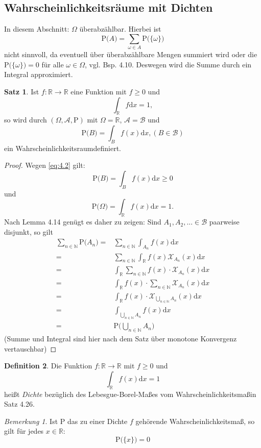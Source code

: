\documentclass[a4paper,12pt,fleqn]{scrartcl}
\newcommand{\N}{\mathbb{N}}
\newcommand{\R}{\mathbb{R}}
\newcommand{\m}[1]{\mathcal{ #1 }}
\newcommand{\prob}[1]{\text{P(} #1 \text{)}}
\newcommand{\WR}{Wahrscheinlichkeitsraum}
\newcommand{\WM}{Wahrscheinlichkeitsmaß}
\theoremstyle{definition}
\newtheorem{definition}{Definition}[section]
\newtheorem{satz}[definition]{Satz}
\theoremstyle{plain}
\theoremstyle{remark}
\newtheorem*{bemerkung}{Bemerkung}
\begin{document}
\subsection{Wahrscheinlichkeitsräume mit Dichten}
In diesem Abschnitt: $\Omega$ überabzählbar.
Hierbei ist
\[\prob{A}=\sum_{\omega\in A}\prob{\{\omega\}}\]
nicht sinnvoll, da eventuell über überabzählbare Mengen summiert wird oder die $\prob{\{\omega\}}=0$ für alle $\omega\in\Omega$, vgl. Bsp. 4.10. Deswegen wird die Summe durch ein Integral approximiert.
\begin{satz}
Ist $f:\R\to\R$ eine Funktion mit $f\geq 0$ und 
\begin{equation*}\label{eq:4.2}
\int_{\R}f\mathrm{d}x=1,
\end{equation*}
so wird durch $(\Omega,\m{A},\text{P})$ mit $\Omega=\R$, $\m{A}=\m{B}$ und
\begin{equation*}\label{eq:4.3}
\prob{B}=\int_{B}f(x)\mathrm{d}x,(B\in\m{B})
\end{equation*}
ein \WR definiert.
\end{satz}
\begin{proof}
Wegen \eqref{eq:4.2} gilt:
\[\prob{B}=\int_Bf(x)\mathrm{d}x\geq 0\]
und
\[\prob{\Omega}=\int_{\R}f(x)\mathrm{d}x=1.\]
Nach Lemma 4.14 genügt es daher zu zeigen: Sind $A_1,A_2,...\in \m{B}$ paarweise disjunkt, so gilt
\begin{align*}
\sum_{n\in\N}\prob{A_n}=&\sum_{n\in\N}\int_{A_n}f(x)\mathrm{d}x\\
=&\sum_{n\in\N}\int_{\R}f(x)\m{X}_{A_n}(x)\mathrm{d}x\\
=&\int_{\R}\sum_{n\in\N}f(x)\cdot\m{X}_{A_n}(x)\mathrm{d}x\\
=&\int_{\R}f(x)\cdot\sum_{n\in\N}\m{X}_{A_n}(x)\mathrm{d}x\\
=&\int_{\R}f(x)\cdot\m{X}_{\bigcup_{n\in\N}A_n}(x)\mathrm{d}x\\
=&\int_{\bigcup_{n\in\N}A_n}f(x)\mathrm{d}x\\
=&\prob{\bigcup_{n\in\N}A_n}
\end{align*}
(Summe und Integral sind hier nach dem Satz über monotone Konvergenz vertauschbar)
\end{proof}
\begin{definition}
Die Funktion $f:\R\to\R$ mit $f\geq 0$ und
\[\int_{\R}f(x)\mathrm{d}x=1\]
heißt \emph{Dichte} bezüglich des Lebesgue-Borel-Maßes vom \WM in Satz 4.26.
\end{definition}
\begin{bemerkung}
Ist P das zu einer Dichte $f$ gehörende \WM, so gilt für jedes $x\in\R$:
\[\prob{\{ x\}}=0\]
\end{bemerkung}
\end{document}
